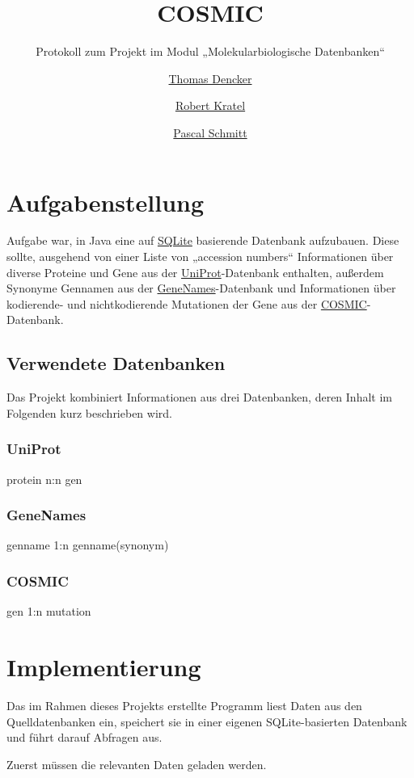 \documentclass{scrartcl}
\title{COSMIC}
\subtitle{Protokoll zum Projekt im Modul „Molekularbiologische Datenbanken“}
\author{%
	\href{mailto:thomas.dencker@stud.uni-goettingen.de}{Thomas Dencker} \and
	\href{mailto:robert.kratel@stud.uni-goettingen.de}{Robert Kratel} \and
	\href{pascal.schmitt1@stud.uni-goettingen.de}{Pascal Schmitt}}
\begin{document}
\maketitle{}
\vfill
\tableofcontents
\newpage

\section{Aufgabenstellung}

Aufgabe war, in Java eine auf \href{http://sqlite.org/}{SQLite} basierende Datenbank aufzubauen. Diese sollte, ausgehend von einer Liste von „accession numbers“ Informationen über diverse Proteine und Gene aus der \href{http://uniprot.org/}{UniProt}-Datenbank enthalten, außerdem Synonyme Gennamen aus der \href{http://genenames.org/}{GeneNames}-Datenbank und Informationen über kodierende- und nichtkodierende Mutationen der Gene aus der \href{http://cancer.sanger.ac.uk/cancergenome/projects/studies/}{COSMIC}-Datenbank.

\subsection{Verwendete Datenbanken}

Das Projekt kombiniert Informationen aus drei Datenbanken, deren Inhalt im Folgenden kurz beschrieben wird.

\subsubsection{UniProt}
protein n:n gen
\subsubsection{GeneNames}
genname 1:n genname(synonym)
\subsubsection{COSMIC}
gen 1:n mutation

\section{Implementierung}

Das im Rahmen dieses Projekts erstellte Programm liest Daten aus den Quelldatenbanken ein, speichert sie in einer eigenen SQLite-basierten Datenbank und führt darauf Abfragen aus.

Zuerst müssen die relevanten Daten geladen werden.
\end{document}
